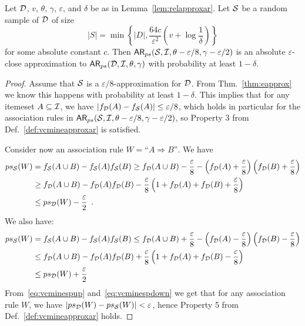 \begin{lemma}\label{lem:psapproxabs}
  Let ${\cal D}$, $v$, $\theta$, $\gamma$, $\varepsilon$, and $\delta$ be as in
  Lemma~\ref{lem:relapproxar}. Let ${\cal S}$ be a random sample of ${\cal D}$ of size
  \[
  |S|=\min\left\{|D|,\frac{64c}{\varepsilon^2}\left(v+\log\frac{1}{\delta}\right)\right\}
  \]
  for some absolute constant $c$. Then
  $\mathsf{AR}_{ps}({\cal S},{\cal I},\theta-\varepsilon/8,\gamma-\varepsilon/2)$ is an absolute
  $\varepsilon$-close approximation to $\mathsf{AR}_{ps}({\cal D},{\cal I},\theta,\gamma)$ with
  probability at least $1-\delta$. 
\end{lemma}
\begin{proof}
  Assume that ${\cal S}$ is a $\varepsilon/8$-approximation for ${\cal D}$. From
  Thm.~\ref{thm:eapprox} we know this happens with probability at least $1-\delta$.
  This implies that for any itemeset $A\subseteq{\cal I}$, we have
  $|f_{\cal D}(A)-f_{\cal S}(A)|\le\varepsilon/8$, which holds in particular for the
  association rules in
  $\mathsf{AR}_{ps}({\cal S},{\cal I},\theta-\varepsilon/8,\gamma-\varepsilon/2)$, so Property 3
  from Def.~\ref{def:vcmineapproxar} is satisfied.

  Consider now an association rule $W=\mbox{``}A\Rightarrow B\mbox{''}$. We have 
  \begin{equation}\label{eq:vcminespup}
  \begin{aligned}
  ps_{\cal S}(W)&=f_{\cal S}(A\cup B)-f_{\cal S}(A)f_{\cal S}(B)\ge f_{\cal D}(A\cup
  B)-\frac{\varepsilon}{8}-\left(f_{\cal D}(A)+\frac{\varepsilon}{8}\right)\left(f_{\cal D}(B)+\frac{\varepsilon}{8}\right)\\
  &\ge f_{\cal D}(A\cup
  B)-f_{\cal D}(A)f_{\cal D}(B)-\frac{\varepsilon}{8}\left(1+f_{\cal D}(A)+f_{\cal D}(B)+\frac{\varepsilon}{8}\right)\\
  &\le ps_{\cal D}(W)-\frac{\varepsilon}{2}\enspace.
  \end{aligned}
\end{equation}
We also have:
  \begin{equation}\label{eq:vcminespdown}
    \begin{aligned}
      ps_{\cal S}(W)&=f_{\cal S}(A\cup B)-f_{\cal S}(A)f_{\cal S}(B)\le f_{\cal D}(A\cup
  B)+\frac{\varepsilon}{8}-\left(f_{\cal D}(A)-\frac{\varepsilon}{8}\right)\left(f_{\cal D}(B)-\frac{\varepsilon}{8}\right)
  \\ 
  &\le f_{\cal D}(A\cup
  B)-f_{\cal D}(A)f_{\cal D}(B)+\frac{\varepsilon}{8}\left(1+f_{\cal D}(A)+f_{\cal D}(B)-\frac{\varepsilon}{8}\right)\\
  &\le ps_{\cal D}(W)+\frac{\varepsilon}{2}
    \end{aligned}
  \end{equation}
  From~\eqref{eq:vcminespup} and~\eqref{eq:vcminespdown} we get that for any
  association rule $W$, we have $|ps_{\cal D}(W)-ps_{\cal S}(W)|<\varepsilon$, hence
  Property 5 from Def.~\ref{def:vcmineapproxar} holds.


\end{proof}
